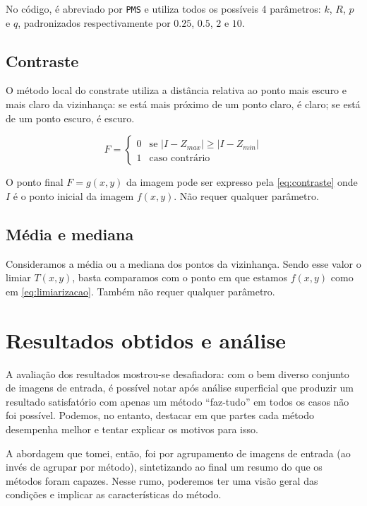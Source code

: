 \documentclass[brazilian,a4paper,twocolumn]{article}
\begin{document}
        No código, é abreviado por \texttt{PMS} e utiliza todos os possíveis 4 parâmetros: $k$, $R$, $p$ e $q$, padronizados respectivamente por $0.25$, $0.5$, $2$ e $10$.

    \subsection{Contraste}

        O método local do constrate utiliza a distância relativa ao ponto mais escuro e mais claro da vizinhança: se está mais próximo de um ponto claro, é claro; se está de um ponto escuro, é escuro.

        \begin{equation}
        \label{eq:contraste}
            F =
            \begin{cases}
                0       & \text{se $\mathopen|I - Z_{max}\mathclose| \geq \mathopen|I - Z_{min}\mathclose|$} \\
                1       & \text{caso contrário}
            \end{cases}
        \end{equation}

        O ponto final $F = g(x, y)$ da imagem pode ser expresso pela \cref{eq:contraste} onde $I$ é o ponto inicial da imagem $f(x, y)$. Não requer qualquer parâmetro.

    \subsection{Média e mediana}

        Consideramos a média ou a mediana dos pontos da vizinhança. Sendo esse valor o limiar $T(x, y)$, basta comparamos com o ponto em que estamos $f(x, y)$ como em \cref{eq:limiarizacao}. Também não requer qualquer parâmetro.


\section{Resultados obtidos e análise}

    A avaliação dos resultados mostrou-se desafiadora: com o bem diverso conjunto de imagens de entrada, é possível notar após análise superficial que produzir um resultado satisfatório com apenas um método ``faz-tudo'' em todos os casos não foi possível. Podemos, no entanto, destacar em que partes cada método desempenha melhor e tentar explicar os motivos para isso.

    A abordagem que tomei, então, foi por agrupamento de imagens de entrada (ao invés de agrupar por método), sintetizando ao final um resumo do que os métodos foram capazes. Nesse rumo, poderemos ter uma visão geral das condições e implicar as características do método.
\end{document}
